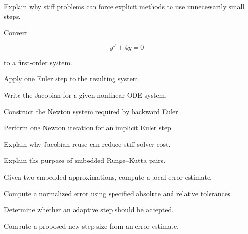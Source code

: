 \begin{exercise}[3]
Explain why stiff problems can force explicit methods to use unnecessarily
small steps.
\end{exercise}

\begin{exercise}[2]
Convert

\[
y''+4y=0
\]

to a first-order system.
\end{exercise}

\begin{exercise}[3]
Apply one Euler step to the resulting system.
\end{exercise}

\begin{exercise}[3]
Write the Jacobian for a given nonlinear ODE system.
\end{exercise}

\begin{exercise}[3]
Construct the Newton system required by backward Euler.
\end{exercise}

\begin{exercise}[3]
Perform one Newton iteration for an implicit Euler step.
\end{exercise}

\begin{exercise}[3]
Explain why Jacobian reuse can reduce stiff-solver cost.
\end{exercise}

\begin{exercise}[2]
Explain the purpose of embedded Runge--Kutta pairs.
\end{exercise}

\begin{exercise}[3]
Given two embedded approximations, compute a local error estimate.
\end{exercise}

\begin{exercise}[3]
Compute a normalized error using specified absolute and relative
tolerances.
\end{exercise}

\begin{exercise}[3]
Determine whether an adaptive step should be accepted.
\end{exercise}

\begin{exercise}[3]
Compute a proposed new step size from an error estimate.
\end{exercise}

